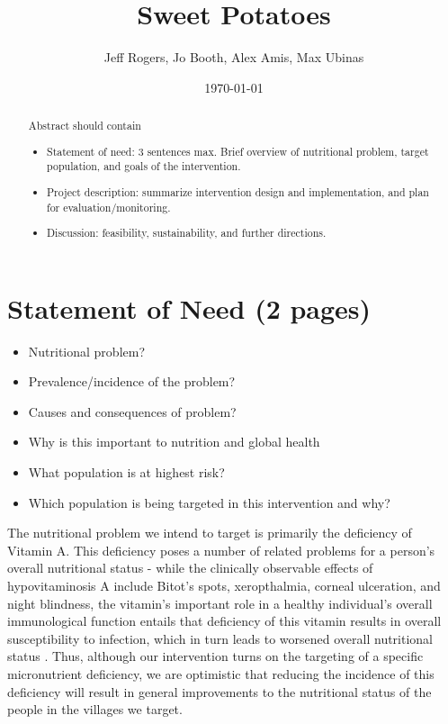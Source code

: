 \documentclass[12pt, letterpaper, draft]{article}
\begin{document}
\title{Sweet Potatoes}
\author{Jeff Rogers, Jo Booth, Alex Amis, Max Ubinas}
\date{\today}
\maketitle

\thispagestyle{empty}

\begin{abstract}
Abstract should contain
\begin{itemize}
    \item Statement of need: 3 sentences max. Brief overview of nutritional
    problem, target population, and goals of the intervention.
    \item Project description: summarize intervention design and implementation,
    and plan for evaluation/monitoring.
    \item Discussion: feasibility, sustainability, and further directions.
\end{itemize}
\end{abstract}
\pagebreak
\setcounter{page}{1}

\section{Statement of Need (2 pages)}
\begin{itemize}
    \item Nutritional problem?
    \item Prevalence/incidence of the problem?
    \item Causes and consequences of problem?
    \item Why is this important to nutrition and global health
    \item What population is at highest risk?
    \item Which population is being targeted in this intervention and why?
\end{itemize}

The nutritional problem we intend to target is primarily the deficiency of Vitamin A. This deficiency poses a number of related problems for a person's overall nutritional status - while the clinically observable effects of hypovitaminosis A include Bitot's spots, xeropthalmia, corneal ulceration, and night blindness, the vitamin's important role in a healthy individual's overall immunological function entails that deficiency of this vitamin results in overall susceptibility to infection, which in turn leads to worsened overall nutritional status \cite{underwood1978hypovitaminosis}. Thus, although our intervention turns on the targeting of a specific micronutrient deficiency, we are optimistic that reducing the incidence of this deficiency will result in general improvements to the nutritional status of the people in the villages we target.
\end{document}
